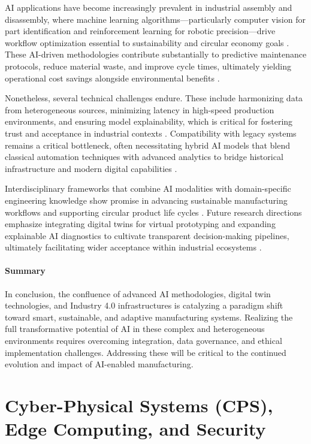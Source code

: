 \documentclass[sigconf]{acmart}
\begin{document}
AI applications have become increasingly prevalent in industrial assembly and disassembly, where machine learning algorithms—particularly computer vision for part identification and reinforcement learning for robotic precision—drive workflow optimization essential to sustainability and circular economy goals \cite{ref6,ref9,ref44}. These AI-driven methodologies contribute substantially to predictive maintenance protocols, reduce material waste, and improve cycle times, ultimately yielding operational cost savings alongside environmental benefits \cite{ref7,ref13}.  

Nonetheless, several technical challenges endure. These include harmonizing data from heterogeneous sources, minimizing latency in high-speed production environments, and ensuring model explainability, which is critical for fostering trust and acceptance in industrial contexts \cite{ref10,ref42}. Compatibility with legacy systems remains a critical bottleneck, often necessitating hybrid AI models that blend classical automation techniques with advanced analytics to bridge historical infrastructure and modern digital capabilities \cite{ref20,ref36}.  

Interdisciplinary frameworks that combine AI modalities with domain-specific engineering knowledge show promise in advancing sustainable manufacturing workflows and supporting circular product life cycles \cite{ref29}. Future research directions emphasize integrating digital twins for virtual prototyping and expanding explainable AI diagnostics to cultivate transparent decision-making pipelines, ultimately facilitating wider acceptance within industrial ecosystems \cite{ref38}.

\paragraph{Summary}

In conclusion, the confluence of advanced AI methodologies, digital twin technologies, and Industry 4.0 infrastructures is catalyzing a paradigm shift toward smart, sustainable, and adaptive manufacturing systems. Realizing the full transformative potential of AI in these complex and heterogeneous environments requires overcoming integration, data governance, and ethical implementation challenges. Addressing these will be critical to the continued evolution and impact of AI-enabled manufacturing.

\section{Cyber-Physical Systems (CPS), Edge Computing, and Security}
\end{document}
